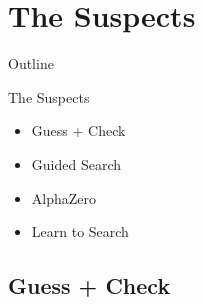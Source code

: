 \documentclass[14pt,aspectratio=169]{beamer}
\begin{document}
\section{The Suspects}

\begin{frame}{Outline}
	\tableofcontents[hideallsubsections]
\end{frame}

\begin{frame}{The Suspects}
	\begin{itemize}
		\item Guess + Check
		\item Guided Search
		\item AlphaZero
		\item Learn to Search
	\end{itemize}
\end{frame}

\subsection{Guess + Check}
\end{document}
